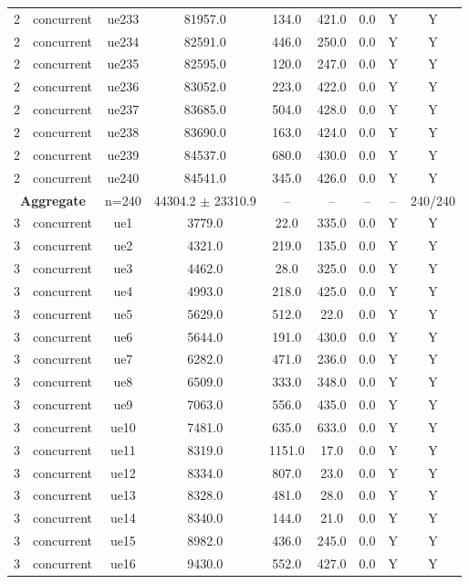 \begin{table}[ht]
\begin{tabular}{|c|c|c|c|c|c|c|c|c|}
2 & concurrent & ue233 & 81957.0 & 134.0 & 421.0 & 0.0 & Y & Y \\
2 & concurrent & ue234 & 82591.0 & 446.0 & 250.0 & 0.0 & Y & Y \\
2 & concurrent & ue235 & 82595.0 & 120.0 & 247.0 & 0.0 & Y & Y \\
2 & concurrent & ue236 & 83052.0 & 223.0 & 422.0 & 0.0 & Y & Y \\
2 & concurrent & ue237 & 83685.0 & 504.0 & 428.0 & 0.0 & Y & Y \\
2 & concurrent & ue238 & 83690.0 & 163.0 & 424.0 & 0.0 & Y & Y \\
2 & concurrent & ue239 & 84537.0 & 680.0 & 430.0 & 0.0 & Y & Y \\
2 & concurrent & ue240 & 84541.0 & 345.0 & 426.0 & 0.0 & Y & Y \\
\multicolumn{2}{|c|}{\textbf{Aggregate}} & n=240 & 44304.2 $\pm$ 23310.9 & -- & -- & -- & -- & 240/240 \\
\hline
3 & concurrent & ue1 & 3779.0 & 22.0 & 335.0 & 0.0 & Y & Y \\
3 & concurrent & ue2 & 4321.0 & 219.0 & 135.0 & 0.0 & Y & Y \\
3 & concurrent & ue3 & 4462.0 & 28.0 & 325.0 & 0.0 & Y & Y \\
3 & concurrent & ue4 & 4993.0 & 218.0 & 425.0 & 0.0 & Y & Y \\
3 & concurrent & ue5 & 5629.0 & 512.0 & 22.0 & 0.0 & Y & Y \\
3 & concurrent & ue6 & 5644.0 & 191.0 & 430.0 & 0.0 & Y & Y \\
3 & concurrent & ue7 & 6282.0 & 471.0 & 236.0 & 0.0 & Y & Y \\
3 & concurrent & ue8 & 6509.0 & 333.0 & 348.0 & 0.0 & Y & Y \\
3 & concurrent & ue9 & 7063.0 & 556.0 & 435.0 & 0.0 & Y & Y \\
3 & concurrent & ue10 & 7481.0 & 635.0 & 633.0 & 0.0 & Y & Y \\
3 & concurrent & ue11 & 8319.0 & 1151.0 & 17.0 & 0.0 & Y & Y \\
3 & concurrent & ue12 & 8334.0 & 807.0 & 23.0 & 0.0 & Y & Y \\
3 & concurrent & ue13 & 8328.0 & 481.0 & 28.0 & 0.0 & Y & Y \\
3 & concurrent & ue14 & 8340.0 & 144.0 & 21.0 & 0.0 & Y & Y \\
3 & concurrent & ue15 & 8982.0 & 436.0 & 245.0 & 0.0 & Y & Y \\
3 & concurrent & ue16 & 9430.0 & 552.0 & 427.0 & 0.0 & Y & Y \\

\end{tabular}
\end{table}
